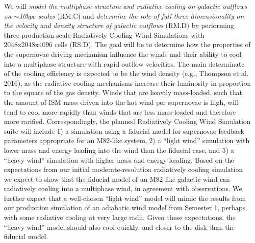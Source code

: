 \documentclass[11pt,letterpaper,english]{article}
\begin{document}
We will \textit{model the multiphase structure and radiative cooling on galactic outflows on $\sim$10kpc scales} (RM.C)
and \textit{determine the role of full three-dimensionality on the velocity and density structure of galactic outflows} (RM.D)
by performing three production-scale Radiatively Cooling Wind Simulations with 2048x2048x4096 cells (RS.D). The goal will be to 
determine how the properties of the supernovae driving mechanism influence the winds and their ability to cool
into a multiphase structure with rapid outflow velocities. The main determinate of the cooling efficiency is
expected to be the wind density (e.g., Thompson et al. 2016), as the radiative cooling mechanisms increase their
luminosity in proportion to the square of the gas density. Winds that are heavily mass-loaded, such that the
amount of ISM mass driven into the hot wind per supernovae is high, will tend to cool more rapidly than winds
that are less mass-loaded and therefore more rarified. Correspondingly, the planned Radiatively Cooling Wind Simulation
suite will include 1) a simulation using a 
fiducial model for supernovae feedback parameters appropriate for an M82-like system, 2) a ``light
wind'' simulation with lower mass and energy loading into the wind than the fiducial case, and 3) a ``heavy wind''
simulation with higher mass and energy loading. Based on the expectations from our initial moderate-resolution
radiatively cooling simulation we expect to show that the fiducial model of an M82-like galactic wind can
radiatively cooling into a multiphase wind, in agreement with observations. We further expect that a well-chosen
``light wind'' model will mimic the results from our production simulation of an
adiabatic wind model from Semester 1, perhaps with some radiative cooling at very large radii. Given these
expectations, the ``heavy wind'' model should also cool quickly, and closer to the disk than the fiducial model.
~\\
~\\
\end{document}
